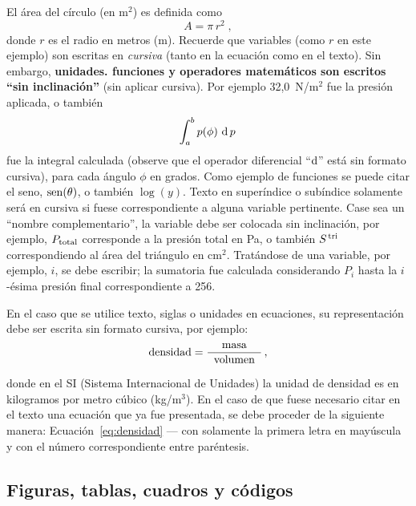 \documentclass[12pt, a4paper, twoside, twocolumn]{article}
\begin{document}
El área del círculo (en m$^2$) es definida como
%
\begin{equation}
	A = \pi \, r^2\;,
\label{eq:area-circ}
\end{equation}
%
donde $r$ es el radio en metros (m). Recuerde que variables (como $r$ en este ejemplo) son escritas en \textit{cursiva} (tanto en la ecuación como en el texto). Sin embargo, \textbf{unidades. funciones y operadores matemáticos son escritos ``sin inclinación''} (sin aplicar cursiva). Por ejemplo 32,0~N/m$^2$ fue la presión aplicada, o también
%
\begin{equation}
	\int_a^b p(\phi)\, \operatorname{d} p\,
\label{eq:int}
\end{equation}
%
fue la integral calculada (observe que el operador diferencial ``$\text{d}$''  está sin formato cursiva), para cada ángulo $\phi$ en grados. Como ejemplo de funciones se puede citar el seno, $\operatorname{sen}(\theta)$, o también $\log(y)$.
%
Texto en superíndice o subíndice solamente será en cursiva si fuese correspondiente a alguna variable pertinente. Case sea un ``nombre complementario'', la variable debe ser colocada sin inclinación, por ejemplo, $P_{\text{total}}$ corresponde a la presión total en Pa, o también $S^{\text{\,tri}}$ correspondiendo al área del triángulo en cm$^2$. Tratándose de una variable, por ejemplo, $i$, se debe escribir; la sumatoria fue calculada considerando $P_i$ hasta la $i$-ésima presión final correspondiente a 256.

En el caso que se utilice texto, siglas o unidades en ecuaciones, su representación debe ser escrita sin formato cursiva, por ejemplo:
%
\begin{equation}
	\text{densidad} = \frac{\text{masa}}{\;\;\text{volumen}\;\;}\,,
\label{eq:densidad}
\end{equation}

donde en el SI (Sistema Internacional de Unidades) la unidad de densidad es en kilogramos por metro cúbico (kg/m$^3$).
%
En el caso de que fuese necesario citar en el texto una ecuación que ya fue presentada, se debe proceder de la siguiente manera: Ecuación~\eqref{eq:densidad} --- con solamente la primera letra en mayúscula y con el número correspondiente entre paréntesis.

\subsection{Figuras, tablas, cuadros y códigos}
\end{document}
